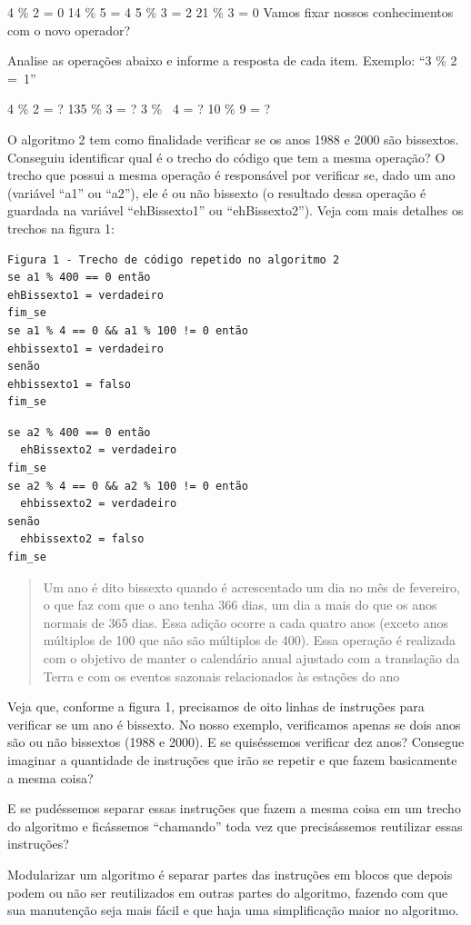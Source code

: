 \documentclass[11pt]{article}
\begin{document}
4 \% 2 = 0
14 \% 5 = 4
5 \% 3 = 2
21 \% 3 = 0
Vamos fixar nossos conhecimentos com o novo operador?

Analise as operações abaixo e informe a resposta de cada item. Exemplo: “3 \% 2 = 1”

4 \% 2 = ?
135 \% 3 = ?
3 \%  4 = ?
10 \% 9 = ?

O algoritmo 2 tem como finalidade verificar se os anos 1988 e 2000 são bissextos. Conseguiu identificar qual é o trecho do código que tem a mesma operação? O trecho que possui a mesma operação é responsável por verificar se, dado um ano (variável “a1” ou “a2”), ele é ou não bissexto (o resultado dessa operação é guardada na variável “ehBissexto1” ou “ehBissexto2”). Veja com mais detalhes os trechos na figura 1:

\begin{verbatim}
Figura 1 - Trecho de código repetido no algoritmo 2
se a1 % 400 == 0 então
ehBissexto1 = verdadeiro
fim_se
se a1 % 4 == 0 && a1 % 100 != 0 então
ehbissexto1 = verdadeiro
senão
ehbissexto1 = falso
fim_se
\end{verbatim}

\begin{verbatim}
se a2 % 400 == 0 então
  ehBissexto2 = verdadeiro
fim_se
se a2 % 4 == 0 && a2 % 100 != 0 então
  ehbissexto2 = verdadeiro
senão
  ehbissexto2 = falso
fim_se
\end{verbatim}

\begin{quote}
Um ano é dito bissexto quando é acrescentado um dia no mês de fevereiro, o que faz com que o ano tenha 366 dias, um dia a mais do que os anos normais de 365 dias. Essa adição ocorre a cada quatro anos (exceto anos múltiplos de 100 que não são múltiplos de 400). Essa operação é realizada com o objetivo de manter o calendário anual ajustado com a translação da Terra e com os eventos sazonais relacionados às estações do ano
\end{quote}
Veja que, conforme a figura 1, precisamos de oito linhas de instruções para verificar se um ano é bissexto. No nosso exemplo, verificamos apenas se dois anos são ou não bissextos (1988 e 2000). E se quiséssemos verificar dez anos? Consegue imaginar a quantidade de instruções que irão se repetir e que fazem basicamente a mesma coisa?

E se pudéssemos separar essas instruções que fazem a mesma coisa em um trecho do algoritmo e ficássemos “chamando” toda vez que precisássemos reutilizar essas instruções?

Modularizar um algoritmo é separar partes das instruções em blocos que depois podem ou não ser reutilizados em outras partes do algoritmo, fazendo com que sua manutenção seja mais fácil e que haja uma simplificação maior no algoritmo.
\end{document}

